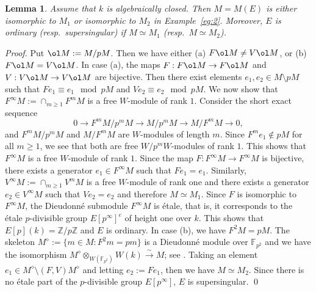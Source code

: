 \documentclass[]{amsart}
\theoremstyle{plain}
\newtheorem{lemma}[thm]{Lemma}
\theoremstyle{definition}
\theoremstyle{remark}
\newcommand{\Z}{\mathbb Z}
\newcommand{\F}{\mathbb F}
\newcommand{\<}{\langle}   %
\renewcommand{\>}{\rangle} %
\newcommand{\isoto}{\stackrel{\sim}{\longrightarrow}}
\newcommand{\dieu}{Dieudonn\'{e} }
\begin{document}
\begin{lemma}\label{lm:elliptic}
    Assume that $k$ is algebraically closed. Then $M=M(E)$ is either isomorphic to  $M_1$ or isomorphic to $M_2$ in Example~\ref{eg:2}. Moreover, $E$ is ordinary (resp.~supersingular) if $M\simeq M_1$ (resp.~$M\simeq M_2$). 
\end{lemma}
\begin{proof}
    Put $\ol M:=M/pM$. Then we have either (a) $F\ol M \neq V \ol M$, or (b) $F\ol M = V \ol M$. In case (a), the maps $F: F\ol M\to F\ol M$ and $V: V\ol M \to V \ol M$ are bijective. Then there exist elements $e_1, e_2\in M\setminus pM$ such that $F e_1\equiv e_1 \mod pM$ and $Ve_2\equiv e_2 \mod pM$. 
     We now show that $F^\infty M:=\cap_{m\ge 1} F^m M$ is a free $W$-module of rank $1$. Consider the short exact sequence 
    \[ 0 \to F^m M/p^m M \to M / p^m M\to M/F^m M\to 0, \]
    and $F^m M/p^m M$ and $M/F^m M$ are $W$-modules of length $m$. Since $F^m e_1 \not \in pM$ for all $m\ge 1$, we see that both are free $W/p^mW$-modules of rank $1$. This shows that $F^\infty M$ is a free $W$-module of rank $1$. Since the map $F: F^\infty M\to F^\infty M$ is bijective, there exists a generator $e_1\in F^\infty M$ such that $F e_1=e_1$. Similarly, $V^\infty M:= \cap_{m\ge 1} V^m M$ is a free $W$-module of rank one and there exists a generator $e_2\in V^\infty M$ such that $Ve_2=e_2$ and therefore $M\simeq M_1$.
    Since $F$ is isomorphic to $F^\infty M$, the \dieu submodule $F^\infty M$ is \'etale, that is, it corresponds to the \'etale $p$-divisible group $E[p^\infty]^e$ of height one over $k$. This shows that $E[p](k)=\Z/p\Z$ and $E$ is ordinary. In case (b), we have $F^2 M=pM$. The skeleton $M^\diamond:=\{m\in M : F^2m=p m\}$ is a \dieu module over $\F_{p^2}$ and we have the isomorphism $M^\diamond \otimes_{W(\F_{p^2})} W(k)\isoto M$; see \cite[Sect.~5.7]{li-oort}. Taking an element $e_1\in M^\diamond \setminus (F,V) M^\diamond$ and letting $e_2:=Fe_1$,  then we have $M\simeq M_2$.
     Since there is no \'etale part of the $p$-divisible group $E[p^\infty]$, $E$ is supersingular. \qed 
\end{proof}

\end{document}
